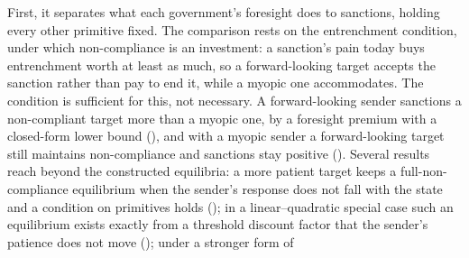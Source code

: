  First, it separates what each
government's foresight does to sanctions, holding every other primitive fixed. The
comparison rests on the entrenchment condition, under which non-compliance is an
investment: a sanction's pain today buys entrenchment worth at least as much, so a
forward-looking target accepts the sanction rather than pay to end it, while a
myopic one accommodates. The condition is sufficient for this, not necessary. A
forward-looking sender sanctions a non-compliant target more than a myopic one, by a
foresight premium with a closed-form lower bound (), and with a myopic
sender a forward-looking target still maintains non-compliance and sanctions stay positive
(). Several results reach beyond the constructed equilibria: a
more patient target keeps a full-non-compliance equilibrium when the sender's response
does not fall with the state and a condition on primitives holds
(); in a linear--quadratic special case such an
equilibrium exists exactly from a threshold discount factor that the sender's
patience does not move (); under a stronger form of
